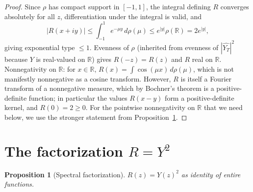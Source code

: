 \documentclass[11pt]{article}
\newtheorem{proposition}[theorem]{Proposition}
\theoremstyle{definition}
\theoremstyle{remark}
\begin{document}
\begin{proof}
Since $\rho$ has compact support in $[-1,1]$, the integral defining $R$ converges absolutely for all $z$, differentiation under the integral is valid, and
\[
|R(x+iy)| \leq \int_{-1}^{1} e^{-\mu y}\, d\rho(\mu) \leq e^{|y|}\rho(\mathbb R) = 2 e^{|y|},
\]
giving exponential type $\leq 1$. Evenness of $\rho$ (inherited from evenness of $|\widehat{Y_T}|^2$ because $Y$ is real-valued on $\mathbb R$) gives $R(-z) = R(z)$ and $R$ real on $\mathbb R$. Nonnegativity on $\mathbb R$: for $x \in \mathbb R$, $R(x) = \int \cos(\mu x)\, d\rho(\mu)$, which is not manifestly nonnegative as a cosine transform. However, $R$ is itself a Fourier transform of a nonnegative measure, which by Bochner's theorem is a positive-definite function; in particular the values $R(x-y)$ form a positive-definite kernel, and $R(0) = 2 \geq 0$. For the pointwise nonnegativity on $\mathbb R$ that we need below, we use the stronger statement from Proposition~\ref{prop:square}.
\end{proof}

\section{The factorization $R = Y^2$}

\begin{proposition}[Spectral factorization]\label{prop:square}
$R(z) = Y(z)^2$ as identity of entire functions.
\end{proposition}
\end{document}
